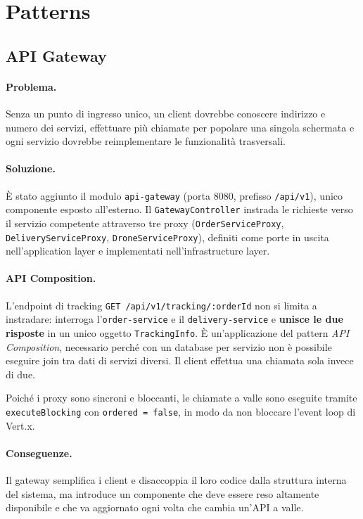 \documentclass[12pt,a4paper]{article}
\begin{document}
\section{Patterns}

\subsection{API Gateway}

\paragraph{Problema.} Senza un punto di ingresso unico, un client dovrebbe conoscere indirizzo e
numero dei servizi, effettuare pi\`u chiamate per popolare una singola schermata e ogni servizio
dovrebbe reimplementare le funzionalit\`a trasversali.

\paragraph{Soluzione.} \`E stato aggiunto il modulo \texttt{api-gateway} (porta 8080, prefisso
\texttt{/api/v1}), unico componente esposto all'esterno. Il \texttt{GatewayController} instrada le
richieste verso il servizio competente attraverso tre proxy (\texttt{OrderServiceProxy},
\texttt{DeliveryServiceProxy}, \texttt{DroneServiceProxy}), definiti come porte in uscita
nell'application layer e implementati nell'infrastructure layer.

\paragraph{API Composition.} L'endpoint di tracking \texttt{GET /api/v1/tracking/:orderId} non si
limita a instradare: interroga l'\texttt{order-service} e il \texttt{delivery-service} e
\textbf{unisce le due risposte} in un unico oggetto \texttt{TrackingInfo}. \`E un'applicazione del
pattern \emph{API Composition}, necessario perch\'e con un database per servizio non \`e possibile
eseguire join tra dati di servizi diversi. Il client effettua una chiamata sola invece di due.

Poich\'e i proxy sono sincroni e bloccanti, le chiamate a valle sono eseguite tramite
\texttt{executeBlocking} con \texttt{ordered = false}, in modo da non bloccare l'event loop di
Vert.x.

\paragraph{Conseguenze.} Il gateway semplifica i client e disaccoppia il loro codice dalla struttura
interna del sistema, ma introduce un componente che deve essere reso altamente disponibile e che
va aggiornato ogni volta che cambia un'API a valle.
\end{document}
